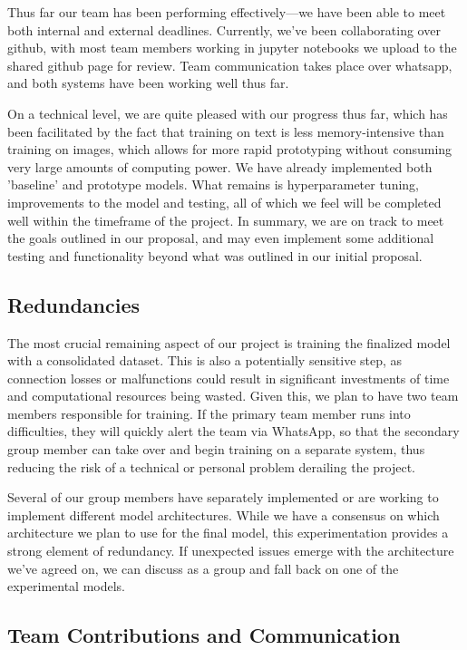 \documentclass{article} %
\begin{document}
Thus far our team has been performing effectively—we have been able to meet both internal and external deadlines. Currently, we've been collaborating over github, with most team members working in jupyter notebooks we upload to the shared github page for review. Team communication takes place over whatsapp, and both systems have been working well thus far.

On a technical level, we are quite pleased with our progress thus far, which has been facilitated by the fact that training on text is less memory-intensive than training on images, which allows for more rapid prototyping without consuming very large amounts of computing power. We have already implemented both 'baseline' and prototype models. What remains is hyperparameter tuning, improvements to the model and testing, all of which we feel will be completed well within the timeframe of the project. In summary, we are on track to meet the goals outlined in our proposal, and may even implement some additional testing and functionality beyond what was outlined in our initial proposal.


\subsection{Redundancies}

The most crucial remaining aspect of our project is training the finalized model with a consolidated dataset. This is also a potentially sensitive step, as connection losses or malfunctions could result in significant investments of time and computational resources being wasted. Given this, we plan to have two team members responsible for training. If the primary team member runs into difficulties, they will quickly alert the team via WhatsApp, so that the secondary group member can take over and begin training on a separate system, thus reducing the risk of a technical or personal problem derailing the project.

Several of our group members have separately implemented or are working to implement different model architectures. While we have a consensus on which architecture we plan to use for the final model, this experimentation provides a strong element of redundancy. If unexpected issues emerge with the architecture we've agreed on, we can discuss as a group and fall back on one of the experimental models.

\subsection{Team Contributions and Communication}
\end{document}

